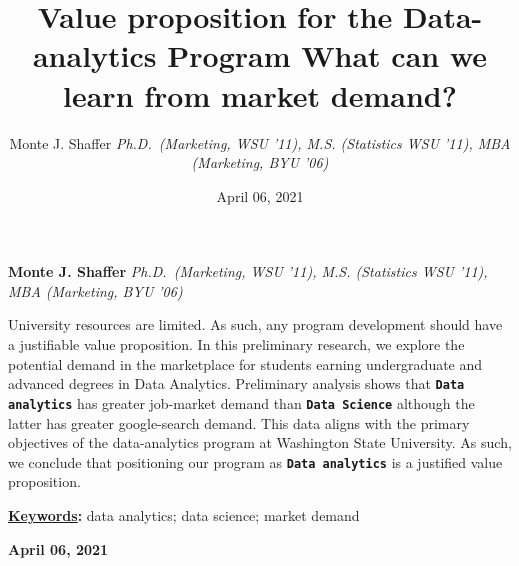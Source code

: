 \documentclass[]{article}
\title{\textbf{\textcolor{WSU.crimson}{Value proposition for the
Data-analytics Program}} \newline \textbf{\textcolor{WSU.gray}{What can
we learn from market demand?}}  }
\author{\Large Monte J.
Shaffer\vspace{0.05in} \newline\normalsize\emph{Ph.D.~(Marketing, WSU
'11), M.S. (Statistics WSU '11), MBA (Marketing, BYU '06)}  }
\date{April 06, 2021}
\newcommand*{\authorfont}{\fontfamily{phv}\selectfont}
\renewenvironment{abstract}
 {{%
    \setlength{\leftmargin}{0mm}
    \setlength{\rightmargin}{\leftmargin}%
  }%
  \relax}
 {\endlist}
\begin{document}
	
%    


{%
\setlength{\parindent}{0pt}
\thispagestyle{plain}
{\fontsize{18}{20}\selectfont\raggedright 
\maketitle  %

}

{
   \vskip 13.5pt\relax \normalsize\fontsize{11}{12} 
   
\textbf{\authorfont Monte J.
Shaffer} \hskip 15pt \emph{\small Ph.D.~(Marketing, WSU '11), M.S.
(Statistics WSU '11), MBA (Marketing, BYU '06)}   

}

}








\begin{abstract}

    \hbox{\vrule height .2pt width 39.14pc}

    \vskip 8.5pt %

\noindent University resources are limited. As such, any program
development should have a justifiable value proposition. In this
preliminary research, we explore the potential demand in the marketplace
for students earning undergraduate and advanced degrees in Data
Analytics. Preliminary analysis shows that \textbf{\tt{Data analytics}}
has greater job-market demand than \textbf{\tt{Data Science}} although
the latter has greater google-search demand. This data aligns with the
primary objectives of the data-analytics program at Washington State
University. \newline As such, we conclude that positioning our program
as \textbf{\tt{Data analytics}} is a justified value proposition.


\vskip 8.5pt \noindent \textbf{\underline{Keywords}:} data analytics;
data science; market demand \par

    




    
    \hbox{\vrule height .2pt width 39.14pc}
    \vskip 5pt 
    \hfill \textbf{\textcolor{WSU.gray}{ April 06, 2021 } }
    \vskip 5pt 
    
\end{abstract}
\end{document}
